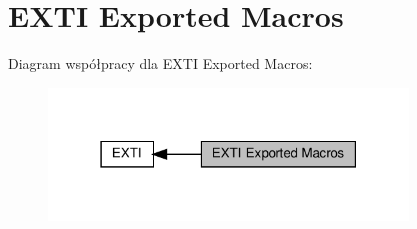 \hypertarget{group___e_x_t_i___exported___macros}{}\section{E\+X\+TI Exported Macros}
\label{group___e_x_t_i___exported___macros}
Diagram współpracy dla E\+X\+TI Exported Macros\+:\nopagebreak
\begin{figure}[H]
\begin{center}
\leavevmode
\includegraphics[width=271pt]{group___e_x_t_i___exported___macros}
\end{center}
\end{figure}
